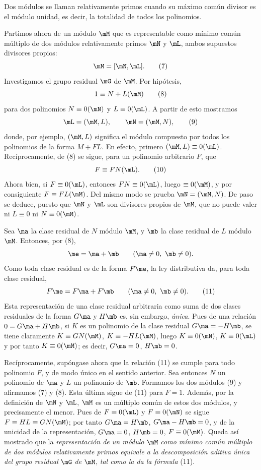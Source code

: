 \documentclass[11pt]{article}
\begin{document}
Dos módulos se llaman relativamente primos cuando su máximo común divisor es el módulo unidad, es decir, la totalidad de todos los polinomios.

Partimos ahora de un módulo $\mM$ que es representable como mínimo común múltiplo de dos módulos relativamente primos $\mN$ y $\mL$, ambos supuestos divisores propios:
\begin{equation}
 \mM=[\mN,\mL].
\tag{7}
\end{equation}
Investigamos el grupo residual $\mG$ de $\mM$. Por hipótesis,
\begin{equation}
 1\equiv N+L(\mM)
\tag{8}
\end{equation}
para dos polinomios $N\equiv0(\mN)$ y $L\equiv0(\mL)$. A partir de esto mostramos
\begin{equation}
 \mL=(\mM,L),\qquad \mN=(\mM,N),
\tag{9}
\end{equation}
donde, por ejemplo, $(\mM,L)$ significa el módulo compuesto por todos los polinomios de la forma $M+FL$. En efecto, primero $(\mM,L)\equiv0(\mL)$. Recíprocamente, de (8) se sigue, para un polinomio arbitrario $F$, que
\begin{equation}
 F\equiv FN(\mL).
\tag{10}
\end{equation}
Ahora bien, si $F\equiv0(\mL)$, entonces $FN\equiv0(\mL)$, luego $\equiv0(\mM)$, y por consiguiente $F\equiv FL(\mM)$. Del mismo modo se prueba $\mN=(\mM,N)$. De paso se deduce, puesto que $\mN$ y $\mL$ son divisores propios de $\mM$, que no puede valer ni $L\equiv0$ ni $N\equiv0(\mM)$.

Sea $\ma$ la clase residual de $N$ módulo $\mM$, y $\mb$ la clase residual de $L$ módulo $\mM$. Entonces, por (8),
\[
 \me=\ma+\mb\qquad(\ma\ne0,\ \mb\ne0).
\]
Como toda clase residual es de la forma $F\me$, la ley distributiva da, para toda clase residual,
\begin{equation}
 F\me=F\ma+F\mb\qquad(\ma\ne0,\ \mb\ne0).
\tag{11}
\end{equation}
Esta representación de una clase residual arbitraria como suma de dos clases residuales de la forma $G\ma$ y $H\mb$ es, sin embargo, \emph{única}. Pues de una relación $0=G\ma+H\mb$, si $K$ es un polinomio de la clase residual $G\ma=-H\mb$, se tiene claramente $K\equiv GN(\mM)$, $K\equiv-HL(\mM)$, luego $K\equiv0(\mN)$, $K\equiv0(\mL)$ y por tanto $K\equiv0(\mM)$; es decir, $G\ma=0$, $H\mb=0$.

Recíprocamente, supóngase ahora que la relación (11) se cumple para todo polinomio $F$, y de modo único en el sentido anterior. Sea entonces $N$ un polinomio de $\ma$ y $L$ un polinomio de $\mb$. Formamos los dos módulos (9) y afirmamos (7) y (8). Esta última sigue de (11) para $F=1$. Además, por la definición de $\mN$ y $\mL$, $\mM$ es un múltiplo común de estos dos módulos, y precisamente el menor. Pues de $F\equiv0(\mL)$ y $F\equiv0(\mN)$ se sigue $F\equiv HL\equiv GN(\mM)$; por tanto $G\ma=H\mb$, $G\ma-H\mb=0$, y de la unicidad de la representación, $G\ma=0$, $H\mb=0$, $F\equiv0(\mM)$. Queda así mostrado que la \emph{representación de un módulo} $\mM$ \emph{como mínimo común múltiplo de dos módulos relativamente primos equivale a la descomposición aditiva única del grupo residual} $\mG$ \emph{de} $\mM$, \emph{tal como la da la fórmula} (11).
\end{document}
